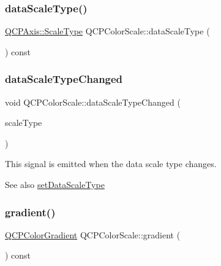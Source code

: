\subsubsection{\texorpdfstring{data\+Scale\+Type()}{dataScaleType()}}
{\footnotesize\ttfamily \hyperlink{class_q_c_p_axis_a36d8e8658dbaa179bf2aeb973db2d6f0}{Q\+C\+P\+Axis\+::\+Scale\+Type} Q\+C\+P\+Color\+Scale\+::data\+Scale\+Type (\begin{DoxyParamCaption}{ }\end{DoxyParamCaption}) const\hspace{0.3cm}{\ttfamily [inline]}}

\mbox{\label{class_q_c_p_color_scale_a61558b962f7791ff2f15a565dcf60181}} 
\subsubsection{\texorpdfstring{data\+Scale\+Type\+Changed}{dataScaleTypeChanged}}
{\footnotesize\ttfamily void Q\+C\+P\+Color\+Scale\+::data\+Scale\+Type\+Changed (\begin{DoxyParamCaption}\item[{\hyperlink{class_q_c_p_axis_a36d8e8658dbaa179bf2aeb973db2d6f0}{Q\+C\+P\+Axis\+::\+Scale\+Type}}]{scale\+Type }\end{DoxyParamCaption})\hspace{0.3cm}{\ttfamily [signal]}}

This signal is emitted when the data scale type changes.

\begin{DoxySeeAlso}{See also}
\hyperlink{class_q_c_p_color_scale_aeb6107d67dd7325145b2498abae67fc3}{set\+Data\+Scale\+Type} 
\end{DoxySeeAlso}
\mbox{\label{class_q_c_p_color_scale_a31d4e3b49461bf6b265eabd028d0f7b2}} 
\subsubsection{\texorpdfstring{gradient()}{gradient()}}
{\footnotesize\ttfamily \hyperlink{class_q_c_p_color_gradient}{Q\+C\+P\+Color\+Gradient} Q\+C\+P\+Color\+Scale\+::gradient (\begin{DoxyParamCaption}{ }\end{DoxyParamCaption}) const\hspace{0.3cm}{\ttfamily [inline]}}

